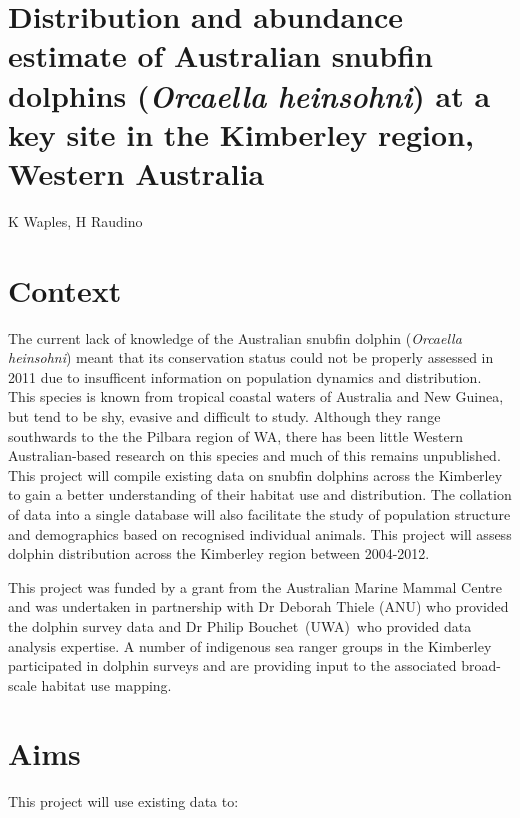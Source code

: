 \documentclass[version=last,
    paper=a4, %
    10pt, %
    usenames,
    dvipsnames,
    oneside, %
    headings=openany, %
    DIV=15 %
]{scrbook}
\begin{document}
\section*{Distribution and abundance estimate of Australian snubfin dolphins
(\emph{Orcaella heinsohni}) at a key site in the Kimberley region,
Western Australia
}

K Waples, H Raudino


\section*{Context}
The current lack of knowledge of the Australian snubfin dolphin
(\emph{Orcaella heinsohni}) meant that its conservation status could not
be properly assessed in 2011 due to insufficent information on
population dynamics and distribution. This species is known from
tropical coastal waters of Australia and New Guinea, but tend to be shy,
evasive and difficult to study. Although they range southwards to the
the Pilbara region of WA, there has been little Western Australian-based
research on this species and much of this remains unpublished. This
project will compile existing data on snubfin dolphins across the
Kimberley to gain a better understanding of their habitat use and
distribution. The collation of data into a single database will also
facilitate the study of population structure and demographics based on
recognised individual animals. This project will assess dolphin
distribution across the Kimberley region between 2004-2012.

This project was funded by a grant from the Australian Marine Mammal
Centre and was undertaken in partnership with Dr Deborah Thiele (ANU)
who provided the dolphin survey data and Dr Philip Bouchet~(UWA)~who
provided data analysis expertise. A number of indigenous sea ranger
groups in the Kimberley participated in dolphin surveys and are
providing input to the associated broad-scale habitat use mapping.~



\section*{Aims}
This project will use existing data to:
\end{document}
